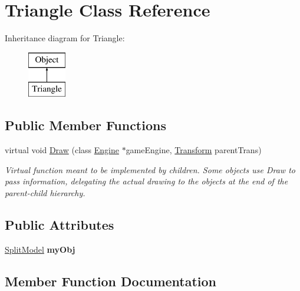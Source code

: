 \hypertarget{class_triangle}{}\section{Triangle Class Reference}
\label{class_triangle}
Inheritance diagram for Triangle\+:\begin{figure}[H]
\begin{center}
\leavevmode
\includegraphics[height=2.000000cm]{class_triangle}
\end{center}
\end{figure}
\subsection*{Public Member Functions}
\begin{DoxyCompactItemize}
\item 
virtual void \hyperlink{class_triangle_a2c8418bbe7a955b9ad53571a5832e1b0}{Draw} (class \hyperlink{class_engine}{Engine} $\ast$game\+Engine, \hyperlink{class_transform}{Transform} parent\+Trans)
\begin{DoxyCompactList}\small\item\em Virtual function meant to be implemented by children. Some objects use Draw to pass information, delegating the actual drawing to the objects at the end of the parent-\/child hierarchy. \end{DoxyCompactList}\end{DoxyCompactItemize}
\subsection*{Public Attributes}
\begin{DoxyCompactItemize}
\item 
\hypertarget{class_triangle_abf0ea31793702554dbc5f446ebb55527}{}\label{class_triangle_abf0ea31793702554dbc5f446ebb55527} 
\hyperlink{class_split_model}{Split\+Model} {\bfseries my\+Obj}
\end{DoxyCompactItemize}


\subsection{Member Function Documentation}
\hypertarget{class_triangle_a2c8418bbe7a955b9ad53571a5832e1b0}{}\label{class_triangle_a2c8418bbe7a955b9ad53571a5832e1b0} 
